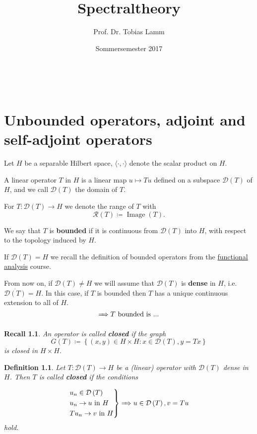 \documentclass[12pt]{extreport} %
\title{Spectraltheory}
\author{Prof. Dr. Tobias Lamm}
\date{Sommersemester 2017}
\makeatletter
\newcommand{\DO}[1]{\mathcal{D}\left( {#1} \right)}
\newcommand{\RO}[1]{\mathcal{R}\left( {#1} \right)}
\theoremstyle{named}
\theoremstyle{nnamed}
\theoremstyle{itshape}
\newtheorem{definition}[unnamedtheorem]{Definition}
\theoremstyle{normal}
\newtheorem*{recall}{Recall}
\def\maketitle{ \begin{titlepage} 
			~\vspace{3cm} 
		\begin{center} {\Huge \@title} \end{center} 
	 		\vspace*{1cm} 
	 	\begin{center} {\large \@author} \end{center} 
	 	\vspace*{-0.5cm}
	 	\begin{center} \@date \end{center} 
	 		\vspace*{7cm} 
	 	\begin{center} \@publishers \end{center} 
	 		\vfill 
	\end{titlepage} }
\makeatother
\begin{document}
\begin{titlepage}
	\maketitle
	\thispagestyle{empty}
\end{titlepage}

\tableofcontents
\thispagestyle{empty}


\chapter{Unbounded operators, adjoint and self-adjoint operators}

Let $H$ be a separable Hilbert space, $\langle \cdot, \cdot \rangle$ denote the scalar product on $H$. ~\bigskip

A linear operator $T$ in $H$ is a linear map $u \mapsto Tu$ defined on a subspace $\DO{T}$ of $H$, and we call $\DO{T}$ the domain of $T$. ~\smallskip

For $T \colon \DO{T} \rightarrow H$ we denote the range of $T$ with
$$ \RO{T} \coloneqq \operatorname{Image}\left( T \right). $$

We say that $T$ is \textbf{bounded} if it is continuous from $\DO{T}$ into $H$, with respect to the topology induced by $H$. ~\smallskip

If $\DO{T} = H$ we recall the definition of bounded operators from the \href{https://github.com/MBelica/Funktionalanalysis-WS2015}{functional analysis} course. ~\bigskip

From now on, if $\DO{T} \neq H$ we will assume that $\DO{T}$ is \textbf{dense} in $H$, i.e. $\overline{\DO{T}} = H$. In this case, if $T$ is bounded then $T$ has a unique continuous extension to all of $H$.
$$ \xRightarrow[]{ ~ ~ } T \text{ bounded is ...} $$ %

\begin{recall}
	An operator is called \textbf{closed} if the graph 
	$$ G(T) \coloneqq \left\{ (x, y) \in H \times H \colon x \in \DO{T}, y = Tx \right\} $$
	is closed in $H \times H$.
\end{recall}

\newpage

\begin{definition} \label{i.1:def}
	Let $T \colon \DO{T} \rightarrow H$ be a (linear) operator with $\DO{T}$ dense in $H$. Then $T$ is called \textbf{closed} if the conditions
	
	$$ 
		\begin{rcases}
			u_n \in \DO{T} \\
			u_n \rightarrow u \text{ in } H \\
			T u_n \rightarrow v \text{ in } H
		\end{rcases} \RightArrow u \in \DO{T}, v = Tu
	$$
	hold.
\end{definition}
\end{document}
